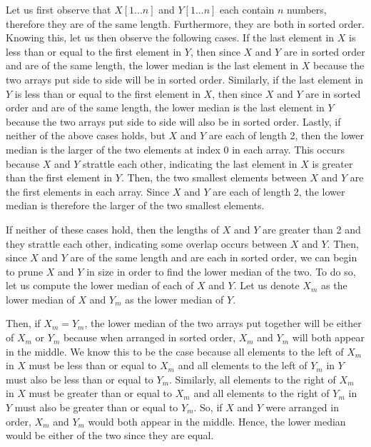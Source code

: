 \documentclass[11pt]{article}
\begin{document}
Let us first observe that $X[1...n]$ and $Y[1...n]$ each contain $n$ numbers, therefore they are of the same length. Furthermore, they are both in sorted order. Knowing this, let us then observe the following cases. If the last element in $X$ is less than or equal to the first element in $Y$, then since $X$ and $Y$ are in sorted order and are of the same length, the lower median is the last element in $X$ because the two arrays put side to side will be in sorted order. Similarly, if the last element in $Y$ is less than or equal to the first element in $X$, then since $X$ and $Y$ are in sorted order and are of the same length, the lower median is the last element in $Y$ because the two arrays put side to side will also be in sorted order. Lastly, if neither of the above cases holds, but $X$ and $Y$ are each of length 2, then the lower median is the larger of the two elements at index 0 in each array. This occurs because $X$ and $Y$ strattle each other, indicating the last element in $X$ is greater than the first element in $Y$. Then, the two smallest elements between $X$ and $Y$ are the first elements in each array. Since $X$ and $Y$ are each of length 2, the lower median is therefore the larger of the two smallest elements.

If neither of these cases hold, then the lengths of $X$ and $Y$ are greater than 2 and they strattle each other, indicating some overlap occurs between $X$ and $Y$. Then, since $X$ and $Y$ are of the same length and are each in sorted order, we can begin to prune $X$ and $Y$ in size in order to find the lower median of the two. To do so, let us compute the lower median of each of $X$ and $Y$. Let us denote $X_m$ as the lower median of $X$ and $Y_m$ as the lower median of $Y$.

Then, if $X_m = Y_m$, the lower median of the two arrays put together will be either of $X_m$ or $Y_m$ because when arranged in sorted order, $X_m$ and $Y_m$ will both appear in the middle. We know this to be the case because all elements to the left of $X_m$ in $X$ must be less than or equal to $X_m$ and all elements to the left of $Y_m$ in $Y$ must also be less than or equal to $Y_m$. Similarly, all elements to the right of $X_m$ in $X$ must be greater than or equal to $X_m$ and all elements to the right of $Y_m$ in $Y$ must also be greater than or equal to $Y_m$. So, if $X$ and $Y$ were arranged in order, $X_m$ and $Y_m$ would both appear in the middle. Hence, the lower median would be either of the two since they are equal.
\end{document}
